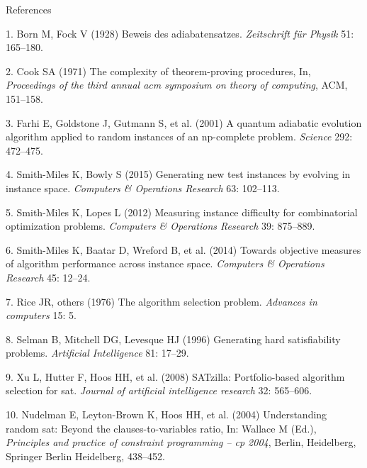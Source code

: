 \documentclass[
  ignorenonframetext,
]{beamer}
\begin{document}
\begin{frame}[allowframebreaks]{References}
\protect\hypertarget{references-1}{}

\small

\hypertarget{refs}{}
\leavevmode\hypertarget{ref-Born1928}{}%
1. Born M, Fock V (1928) Beweis des adiabatensatzes. \emph{Zeitschrift
für Physik} 51: 165--180.

\leavevmode\hypertarget{ref-Cook1971}{}%
2. Cook SA (1971) The complexity of theorem-proving procedures, In,
\emph{Proceedings of the third annual acm symposium on theory of
computing}, ACM, 151--158.

\leavevmode\hypertarget{ref-Farhi2001}{}%
3. Farhi E, Goldstone J, Gutmann S, et al. (2001) A quantum adiabatic
evolution algorithm applied to random instances of an np-complete
problem. \emph{Science} 292: 472--475.

\leavevmode\hypertarget{ref-Smith-Miles2015}{}%
4. Smith-Miles K, Bowly S (2015) Generating new test instances by
evolving in instance space. \emph{Computers \& Operations Research} 63:
102--113.

\leavevmode\hypertarget{ref-Smith-Miles2012}{}%
5. Smith-Miles K, Lopes L (2012) Measuring instance difficulty for
combinatorial optimization problems. \emph{Computers \& Operations
Research} 39: 875--889.

\leavevmode\hypertarget{ref-Smith-Miles2014}{}%
6. Smith-Miles K, Baatar D, Wreford B, et al. (2014) Towards objective
measures of algorithm performance across instance space. \emph{Computers
\& Operations Research} 45: 12--24.

\leavevmode\hypertarget{ref-Rice1976}{}%
7. Rice JR, others (1976) The algorithm selection problem.
\emph{Advances in computers} 15: 5.

\leavevmode\hypertarget{ref-Selman1996}{}%
8. Selman B, Mitchell DG, Levesque HJ (1996) Generating hard
satisfiability problems. \emph{Artificial Intelligence} 81: 17--29.

\leavevmode\hypertarget{ref-Xu2008}{}%
9. Xu L, Hutter F, Hoos HH, et al. (2008) SATzilla: Portfolio-based
algorithm selection for sat. \emph{Journal of artificial intelligence
research} 32: 565--606.

\leavevmode\hypertarget{ref-Nudelman2004}{}%
10. Nudelman E, Leyton-Brown K, Hoos HH, et al. (2004) Understanding
random sat: Beyond the clauses-to-variables ratio, In: Wallace M (Ed.),
\emph{Principles and practice of constraint programming -- cp 2004},
Berlin, Heidelberg, Springer Berlin Heidelberg, 438--452.


\end{frame}
\end{document}
